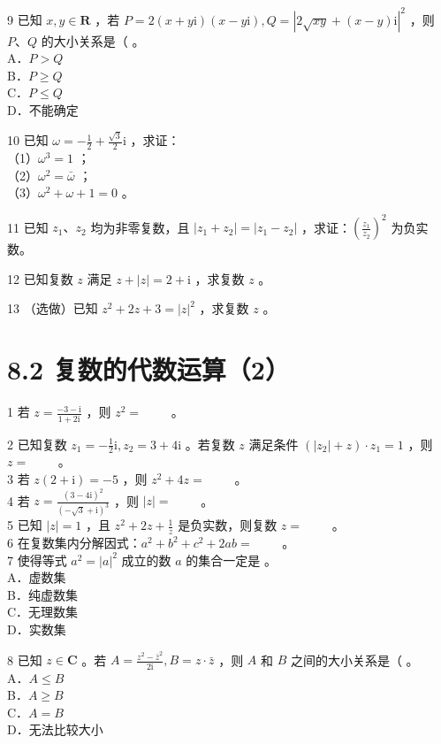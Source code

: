 \documentclass[10pt]{article}
\begin{document}
9 已知 \(x, y \in \mathbf{R}\) ，若 \(P=2(x+y \mathrm{i})(x-y \mathrm{i}), Q=|2 \sqrt{x y}+(x-y) \mathrm{i}|^{2}\) ，则 \(P 、 Q\) 的大小关系是（ 。\\
A．\(P>Q\)\\
B．\(P \geqslant Q\)\\
C．\(P \leqslant Q\)\\
D．不能确定

10 已知 \(\omega=-\frac{1}{2}+\frac{\sqrt{3}}{2} \mathrm{i}\) ，求证：\\
（1）\(\omega^{3}=1\) ；\\
（2）\(\omega^{2}=\bar{\omega}\) ；\\
（3）\(\omega^{2}+\omega+1=0\) 。

11 已知 \(z_{1} 、 z_{2}\) 均为非零复数，且 \(\left|z_{1}+z_{2}\right|=\left|z_{1}-z_{2}\right|\) ，求证：\(\left(\frac{z_{1}}{z_{2}}\right)^{2}\) 为负实数。

12 已知复数 \(z\) 满足 \(z+|z|=2+\mathrm{i}\) ，求复数 \(z\) 。

13 （选做）已知 \(z^{2}+2 z+3=|z|^{2}\) ，求复数 \(z\) 。

\section*{8.2 复数的代数运算（2）}
1 若 \(z=\frac{-3-\mathrm{i}}{1+2 \mathrm{i}}\) ，则 \(z^{2}=\) \(\qquad\)。

2 已知复数 \(z_{1}=-\frac{1}{2} \mathrm{i}, z_{2}=3+4 \mathrm{i}\) 。若复数 \(z\) 满足条件 \(\left(\left|z_{2}\right|+z\right) \cdot z_{1}=1\) ，则 \(z=\) \(\qquad\)。\\
3 若 \(z(2+\mathrm{i})=-5\) ，则 \(z^{2}+4 z=\) \(\qquad\)。\\
4 若 \(z=\frac{(3-4 \mathrm{i})^{2}}{(-\sqrt{3}+\mathrm{i})^{3}}\) ，则 \(|z|=\) \(\qquad\)。\\
5 已知 \(|z|=1\) ，且 \(z^{2}+2 z+\frac{1}{z}\) 是负实数，则复数 \(z=\) \(\qquad\)。\\
6 在复数集内分解因式：\(a^{2}+b^{2}+c^{2}+2 a b=\) \(\qquad\)。\\
7 使得等式 \(a^{2}=|a|^{2}\) 成立的数 \(a\) 的集合一定是 。\\
A．虚数集\\
B．纯虚数集\\
C．无理数集\\
D．实数集

8 已知 \(z \in \mathbf{C}\) 。若 \(A=\frac{z^{2}-\bar{z}^{2}}{2 \mathrm{i}}, B=z \cdot \bar{z}\) ，则 \(A\) 和 \(B\) 之间的大小关系是（ 。\\
A．\(A \leqslant B\)\\
B．\(A \geqslant B\)\\
C．\(A=B\)\\
D．无法比较大小
\end{document}
